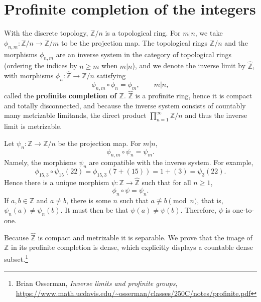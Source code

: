 \documentclass{article}
\theoremstyle{definition}
\begin{document}
\section{Profinite completion of the integers}
With the discrete topology, $\mathbb{Z}/n$ is a topological ring.
For $m|n$, we take $\phi_{n,m}:\mathbb{Z}/n \to \mathbb{Z}/m$ to be the projection map. 
The topological rings
$\mathbb{Z}/n$ and the morphisms $\phi_{n,m}$ are an inverse system in the category of topological rings (ordering the indices by  $n \geq m$ when $m|n$), and we denote the inverse
limit by $\widehat{\mathbb{Z}}$, with morphisms $\phi_n:\widehat{\mathbb{Z}} \to \mathbb{Z}/n$ satisfying
\[
\phi_{n,m} \circ \phi_n = \phi_m, \qquad m|n,
\]
called the \textbf{profinite completion of $\mathbb{Z}$}. 
$\widehat{\mathbb{Z}}$ is a profinite ring, hence it is compact and totally disconnected, and because the inverse system consists of countably many metrizable limitands,
the direct product $\prod_{n=1}^\infty \mathbb{Z}/n$ and thus the inverse limit is metrizable.

Let $\psi_n:\mathbb{Z} \to \mathbb{Z}/n$ be the projection map. For $m|n$, 
\[
\phi_{n,m} \circ \psi_n = \psi_m.
\]
Namely, the morphisms $\psi_n$ are compatible with the inverse system. 
For example,
\[
\phi_{15,3} \circ \psi_{15}(22) = \phi_{15,3}(7+(15)) = 1+(3) = \psi_3(22).
\]
Hence there is a unique morphism $\psi:\mathbb{Z} \to \widehat{\mathbb{Z}}$ such that for all $n \geq 1$,
\[
\phi_n \circ \psi = \psi_n.
\]
If $a,b \in \mathbb{Z}$ and $a \neq b$, there is some $n$ such that $a \not \equiv b \pmod{n}$, that is, $\psi_n(a) \neq \psi_n(b)$. 
It must then be that $\psi(a) \neq \psi(b)$. Therefore, $\psi$ is one-to-one.

Because $\widehat{\mathbb{Z}}$ is compact and metrizable it is separable. 
We prove that the image of $\mathbb{Z}$ in its profinite completion is dense, which explicitly displays a  countable dense subset.\footnote{Brian Osserman,
{\em Inverse limits and profinite groups},
\url{https://www.math.ucdavis.edu/~osserman/classes/250C/notes/profinite.pdf}}
\end{document}
